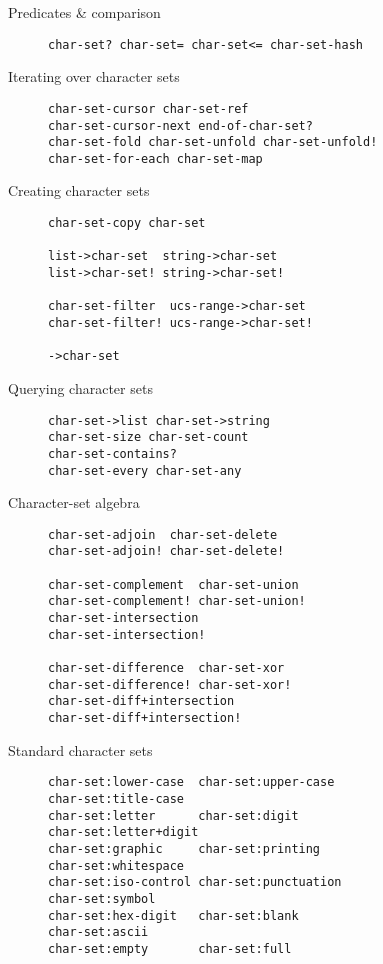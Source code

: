 \begin{description}
\item[ Predicates \& comparison ]
\begin{verbatim}
char-set? char-set= char-set<= char-set-hash
\end{verbatim}
\item[ Iterating over character sets ]
\begin{verbatim}
char-set-cursor char-set-ref 
char-set-cursor-next end-of-char-set? 
char-set-fold char-set-unfold char-set-unfold!
char-set-for-each char-set-map
\end{verbatim}
\item[ Creating character sets ]
\begin{verbatim}
char-set-copy char-set

list->char-set  string->char-set
list->char-set! string->char-set!
    
char-set-filter  ucs-range->char-set 
char-set-filter! ucs-range->char-set!

->char-set
\end{verbatim}
\item[ Querying character sets ]
\begin{verbatim}
char-set->list char-set->string
char-set-size char-set-count 
char-set-contains?
char-set-every char-set-any
\end{verbatim}
\item[ Character-set algebra ]
\begin{verbatim}
char-set-adjoin  char-set-delete
char-set-adjoin! char-set-delete!

char-set-complement  char-set-union  
char-set-complement! char-set-union! 
char-set-intersection
char-set-intersection!

char-set-difference  char-set-xor  
char-set-difference! char-set-xor! 
char-set-diff+intersection
char-set-diff+intersection!
\end{verbatim}
\item[ Standard character sets ]
\begin{verbatim}
char-set:lower-case  char-set:upper-case  
char-set:title-case
char-set:letter      char-set:digit       
char-set:letter+digit
char-set:graphic     char-set:printing    
char-set:whitespace
char-set:iso-control char-set:punctuation 
char-set:symbol
char-set:hex-digit   char-set:blank       
char-set:ascii
char-set:empty       char-set:full
\end{verbatim}
\end{description}

